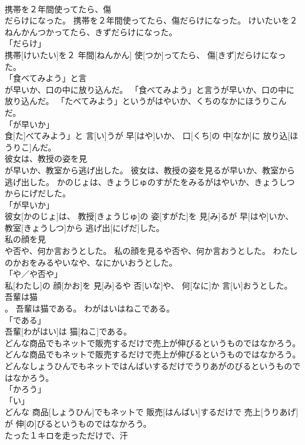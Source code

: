 \documentclass[8pt]{extreport}
\begin{document}
\begin{CJK}{UTF8}{min}
\\	携帯を２年間使ってたら、傷
\\	だらけになった。	携帯を２年間使ってたら、傷だらけになった。	けいたいを２ねんかんつかってたら、きずだらけになった。	
\\	「だらけ」 
\\	携帯[けいたい]を２ 年間[ねんかん] 使[つか]ってたら、 傷[きず]だらけになった。		
\\	「食べてみよう」と言
\\	が早いか、口の中に放り込んだ。	「食べてみよう」と言うが早いか、口の中に放り込んだ。	「たべてみよう」というがはやいか、くちのなかにほうりこんだ。	
\\	「が早いか」 
\\	食[た]べてみよう」と 言[い]うが 早[はや]いか、 口[くち]の 中[なか]に 放り込[ほうりこ]んだ。		
\\	彼女は、教授の姿を見
\\	が早いか、教室から逃げ出した。	彼女は、教授の姿を見るが早いか、教室から逃げ出した。	かのじょは、きょうじゅのすがたをみるがはやいか、きょうしつからにげだした。	
\\	「が早いか」 
\\	彼女[かのじょ]は、 教授[きょうじゅ]の 姿[すがた]を 見[み]るが 早[はや]いか、 教室[きょうしつ]から 逃げ出[にげだ]した。		
\\	私の顔を見
\\	や否や、何か言おうとした。	私の顔を見るや否や、何か言おうとした。	わたしのかおをみるやいなや、なにかいおうとした。	
\\	「や／や否や」 
\\	私[わたし]の 顔[かお]を 見[み]るや 否[いな]や、 何[なに]か 言[い]おうとした。		
\\	吾輩は猫
\\	。	吾輩は猫である。	わがはいはねこである。	
\\	「である」 
\\	吾輩[わがはい]は 猫[ねこ]である。		
\\	どんな商品でもネットで販売するだけで売上が伸びるというものではなかろう。	どんな商品でもネットで販売するだけで売上が伸びるというものではなかろう。	どんなしょうひんでもネットではんばいするだけでうりあがのびるというものではなかろう。	
\\	「かろう」 
\\	「い」 
\\	どんな 商品[しょうひん]でもネットで 販売[はんばい]するだけで 売上[うりあげ]が 伸[の]びるというものではなかろう。		
\\	たった１キロを走っただけで、汗

\end{CJK}
\end{document}
